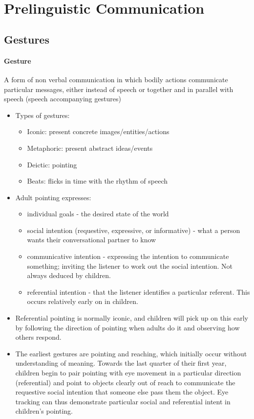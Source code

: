\documentclass{article}
\begin{document}
\section{Prelinguistic Communication}
    \subsection{Gestures}
    \paragraph{Gesture} A form of non verbal communication in which bodily actions communicate particular messages, either instead of speech or together and in parallel with speech (speech accompanying gestures)
    \begin{itemize}
        \item Types of gestures:
    \begin{itemize}
        \item Iconic: present concrete images/entities/actions
        \item Metaphoric: present abstract ideas/events
        \item Deictic: pointing
        \item Beats: flicks in time with the rhythm of speech
    \end{itemize}
    \item Adult pointing expresses:
    \begin{itemize}
        \item individual goals - the desired state of the world
        \item social intention (requestive, expressive, or informative) - what a person wants their conversational partner to know
        \item communicative intention - expressing the intention to communicate something; inviting the listener to work out the social intention. Not always deduced by children.
        \item referential intention - that the listener identifies a particular referent. This occurs relatively early on in children.
    \end{itemize}
    \item Referential pointing is normally iconic, and children will pick up on this early by following the direction of pointing when adults do it and observing how others respond.
    \item The earliest gestures are pointing and reaching, which initially occur without understanding of meaning. Towards the last quarter of their first year, children begin to pair pointing with eye movement in a particular direction (referential) and point to objects clearly out of reach to communicate the requestive social intention that someone else pass them the object. Eye tracking can thus demonstrate particular social and referential intent in children's pointing.

\end{itemize}
\end{document}
